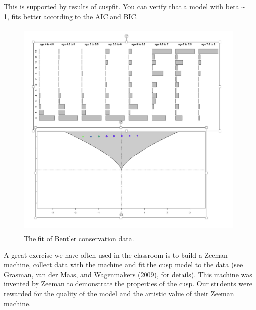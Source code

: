 \documentclass[
  letterpaper,
]{scrbook}
\begin{document}
This is supported by results of cuspfit. You can verify that a model
with beta \textasciitilde{} 1, fits better according to the AIC and BIC.

\begin{figure}

{\centering \includegraphics[width=4.57436in,height=4.30406in]{media/ch3/image25.jpg}

}

\caption{\label{fig-ch3-img25-old-37}The fit of Bentler conservation
data.}

\end{figure}

A great exercise we have often used in the classroom is to build a
Zeeman machine, collect data with the machine and fit the cusp model to
the data (see Grasman, van der Maas, and Wagenmakers (2009), for
details). This machine was invented by Zeeman to demonstrate the
properties of the cusp. Our students were rewarded for the quality of
the model and the artistic value of their Zeeman machine.
\end{document}
